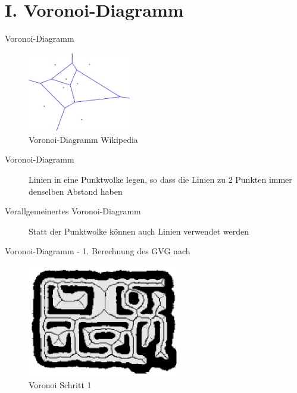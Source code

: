 \section{I. Voronoi-Diagramm}

\begin{frame}{Voronoi-Diagramm}
 \begin{figure}[h]
 \centering
 \includegraphics[width=0.4\textwidth]{./material/voronoi-step1-1.png}
 \caption{Voronoi-Diagramm Wikipedia}
\end{figure}
\begin{description}
 \item[Voronoi-Diagramm] Linien in eine Punktwolke legen, so dass die Linien zu 2 Punkten immer denselben Abstand haben
 \item[Verallgemeinertes Voronoi-Diagramm] Statt der Punktwolke können auch Linien verwendet werden
\end{description}

\end{frame}


\begin{frame}{Voronoi-Diagramm - 1. Berechnung des GVG}
  nach \cite{Thrun1998}

\begin{figure}[h]
 \centering
 \includegraphics[width=0.6\textwidth]{./material/voronoi-step1.png}
 \caption{Voronoi Schritt 1 \cite{Thrun1998}}
\end{figure}

\end{frame}

